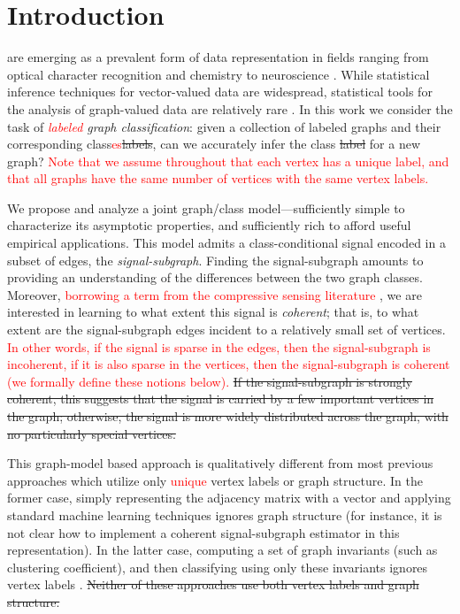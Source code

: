 \documentclass[10pt,journal,cspaper,compsoc]{IEEEtran}
\providecommand{\tr}[1]{\textcolor{red}{#1}}
\begin{document}
\maketitle
\IEEEdisplaynotcompsoctitleabstractindextext
\IEEEpeerreviewmaketitle



\section{Introduction}

 are emerging as a prevalent form of data representation in fields ranging from optical character recognition and chemistry \cite{Bunke2011} to neuroscience \cite{Hagmann2010}.  While statistical inference techniques for vector-valued data are widespread, statistical tools for the analysis of graph-valued data are relatively rare \cite{Bunke2011}. In this work we consider the task of \emph{\tr{labeled} graph classification}: given a collection of labeled graphs and their corresponding class\tr{es}\sout{labels}, can we accurately infer the class \sout{label} for a new graph?  \tr{Note that we assume throughout that each vertex has a unique label, and that all graphs have the same number of vertices with the same vertex labels.}

We propose and analyze a joint graph/class model---sufficiently simple to characterize its asymptotic properties, and sufficiently rich to afford useful empirical applications.  This model admits a class-conditional signal encoded in a subset of edges, the \emph{signal-subgraph}. Finding the signal-subgraph amounts to providing an understanding of the differences between the two graph classes.  Moreover,
\tr{borrowing a term from the compressive sensing literature \cite{Donoho2006, Candes2008a}}, 
 we are interested in learning to what extent this signal is \emph{coherent}; that is, to what extent are the signal-subgraph edges incident to a relatively small set of vertices. \tr{In other words, if the signal is sparse in the edges, then the signal-subgraph is incoherent, if it is also sparse in the vertices, then the signal-subgraph is coherent (we formally define these notions below).} \sout{If the signal-subgraph is strongly coherent, this suggests that the signal is carried by a few important vertices in the graph; otherwise, the signal is more widely distributed across the graph, with no particularly special vertices. }

This graph-model based approach is qualitatively different from most previous approaches which utilize only \tr{unique} vertex labels or graph structure.  In the former case, simply representing the adjacency matrix with a vector and applying standard machine learning techniques ignores graph structure (for instance, it is not clear how to implement a coherent signal-subgraph estimator in this representation).  In the latter case, computing a set of graph invariants (such as clustering coefficient), and then classifying using only these invariants ignores vertex labels \tr{\cite{Kudo2005,Ketkar2009,Bunke2011}}.  \sout{Neither of these approaches use both vertex labels and graph structure.}  
\end{document}
